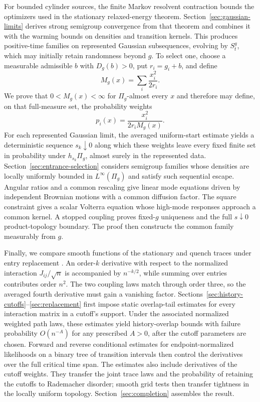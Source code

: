 For bounded cylinder sources, the finite Markov resolvent contraction
bounds the optimizers used in the stationary relaxed-energy theorem.
Section~\ref{sec:gaussian-limits} derives strong semigroup convergence
from that theorem and combines it with the warming bounds on densities
and transition kernels. This produces positive-time families on represented
Gaussian subsequences, evolving by \(S_t^g\), which may initially retain
randomness beyond \(g\).
To select one, choose a measurable admissible \(b\) with \(D_g(b)>0\),
put \(r_i=g_i+b\), and define
\[
 M_g(x)=\sum_i\frac{x_i^2}{2r_i}.
\]
We prove that \(0<M_g(x)<\infty\) for \(\Pi_g\)-almost every \(x\) and
therefore may define, on that full-measure set, the probability weights
\[
 p_i(x)=\frac{x_i^2}{2r_iM_g(x)}.
\]
For each represented Gaussian limit, the averaged uniform-start
estimate yields a deterministic sequence \(s_k\downarrow0\) along
which these weights leave every fixed finite set in probability under
\(h_{s_k}\Pi_g\), almost surely in the represented data.
Section~\ref{sec:entrance-selection} considers semigroup families whose
densities are locally uniformly bounded in \(L^\infty(\Pi_g)\) and satisfy
such sequential escape. Angular ratios and a common rescaling give linear
mode equations driven by independent Brownian motions with a common
diffusion factor. The square constraint gives a scalar Volterra equation
whose high-mode responses approach a common kernel. A stopped coupling
proves fixed-\(g\) uniqueness and the full \(s\downarrow0\) product-topology
boundary. The proof then constructs the common family measurably from \(g\).

Finally, we compare smooth functions of the stationary and quench traces
under entry replacement \cite{Chatterjee2006}. An order-\(k\) derivative
with respect to the normalized interaction \(J_{ij}/\sqrt n\) is
accompanied by \(n^{-k/2}\), while summing over entries contributes
order \(n^2\). The two coupling laws match through order three, so the
averaged fourth derivative must gain a vanishing factor.
Sections~\ref{sec:history-cutoffs}--\ref{sec:replacement} first impose
static overlap-tail estimates for every interaction matrix in a
cutoff's support. Under the associated normalized weighted path laws,
these estimates yield history-overlap bounds with failure probability
\(O(n^{-A})\) for any prescribed \(A>0\), after the cutoff parameters
are chosen. Forward and reverse conditional estimates for
endpoint-normalized likelihoods on a binary tree of transition intervals
then control the derivatives over the full critical time span. The
estimates also include derivatives of the cutoff weights. They
transfer the joint trace laws and the probability of retaining the
cutoffs to Rademacher disorder; smooth grid tests then transfer
tightness in the locally uniform topology.
Section~\ref{sec:completion} assembles the result.
